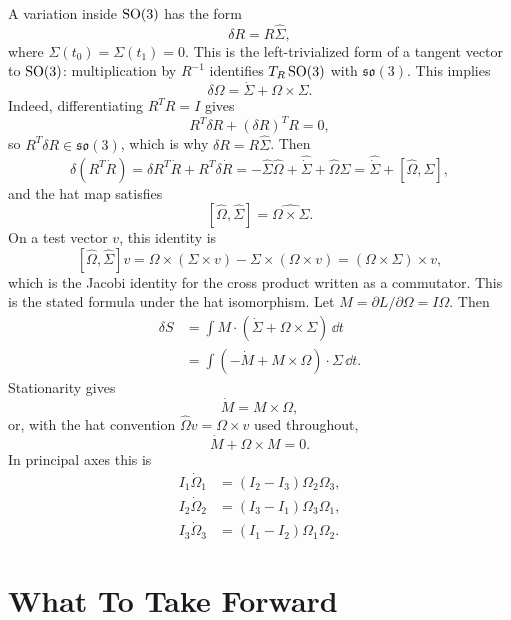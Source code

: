 \begin{derivation}
A variation inside \(\operatorname{SO}(3)\) has the form
\[
  \delta R=R\widehat\Sigma,
\]
where \(\Sigma(t_0)=\Sigma(t_1)=0\). This is the left-trivialized form of a
tangent vector to \(\operatorname{SO}(3)\): multiplication by \(R^{-1}\) identifies
\(T_R\operatorname{SO}(3)\) with \(\mathfrak{so}(3)\). This implies
\[
  \delta\Omega=\dot\Sigma+\Omega\times\Sigma.
\]
Indeed, differentiating \(R^TR=I\) gives
\[
  R^T\delta R+(\delta R)^TR=0,
\]
so \(R^T\delta R\in\mathfrak{so}(3)\), which is why
\(\delta R=R\widehat\Sigma\). Then
\[
  \delta(R^T\dot R)
  =
  \delta R^T\dot R+R^T\delta\dot R
  =
  -\widehat\Sigma\widehat\Omega
  +\widehat{\dot\Sigma}+\widehat\Omega\widehat\Sigma
  =
  \widehat{\dot\Sigma}+[\widehat\Omega,\widehat\Sigma],
\]
and the hat map satisfies
\[
  [\widehat\Omega,\widehat\Sigma]=\widehat{\Omega\times\Sigma}.
\]
On a test vector \(v\), this identity is
\[
  [\widehat\Omega,\widehat\Sigma]v
  =
  \Omega\times(\Sigma\times v)-\Sigma\times(\Omega\times v)
  =
  (\Omega\times\Sigma)\times v,
\]
which is the Jacobi identity for the cross product written as a commutator.
This is the stated formula under the hat isomorphism.
Let \(M=\partial L/\partial\Omega=I\Omega\). Then
\[
\begin{aligned}
  \delta S
  &=
  \int M\cdot(\dot\Sigma+\Omega\times\Sigma)\,\dd t\\
  &=
  \int(-\dot M+M\times\Omega)\cdot\Sigma\,\dd t.
\end{aligned}
\]
Stationarity gives
\[
  \dot M=M\times\Omega,
\]
or, with the hat convention \(\widehat\Omega v=\Omega\times v\) used
throughout,
\[
  \dot M+\Omega\times M=0.
\]
In principal axes this is
\[
\begin{aligned}
  I_1\dot\Omega_1 &= (I_2-I_3)\Omega_2\Omega_3,\\
  I_2\dot\Omega_2 &= (I_3-I_1)\Omega_3\Omega_1,\\
  I_3\dot\Omega_3 &= (I_1-I_2)\Omega_1\Omega_2.
\end{aligned}
\]
\end{derivation}

\section{What To Take Forward}
\label{sec:lagrangian-take-forward}

